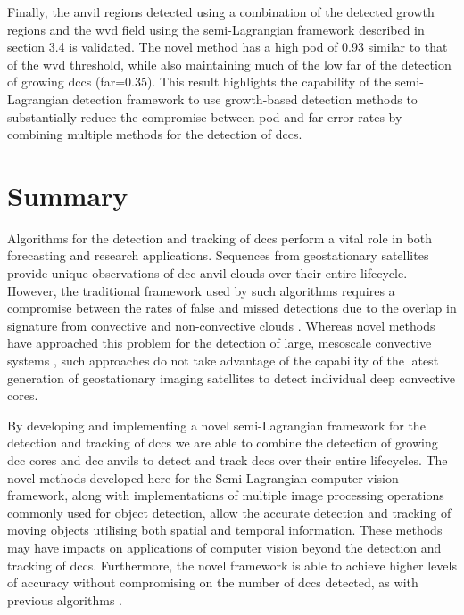 Finally, the anvil regions detected using a combination of the detected growth regions and the \acrshort{wvd} field using the semi-Lagrangian framework described in section 3.4 is validated.
The novel method has a high \acrshort{pod} of 0.93 similar to that of the \acrshort{wvd} threshold, while also maintaining much of the low \acrshort{far} of the detection of growing \acrshort{dcc}s (\acrshort{far}=0.35).
This result highlights the capability of the semi-Lagrangian detection framework to use growth-based detection methods to substantially reduce the compromise between \acrshort{pod} and \acrshort{far} error rates by combining multiple methods for the detection of \acrshort{dcc}s.


\section{Summary}  %

Algorithms for the detection and tracking of \acrshort{dcc}s perform a vital role in both forecasting and research applications.
Sequences from geostationary satellites provide unique observations of \acrshort{dcc} anvil clouds over their entire lifecycle.
However, the traditional framework used by such algorithms requires a compromise between the rates of false and missed detections due to the overlap in signature from convective and non-convective clouds \citep{konduru_new_2013}.
Whereas novel methods have approached this problem for the detection of large, mesoscale convective systems \citep{fiolleau_algorithm_2013}, such approaches do not take advantage of the capability of the latest generation of geostationary imaging satellites to detect individual deep convective cores.

By developing and implementing a novel semi-Lagrangian framework for the detection and tracking of \acrshort{dcc}s we are able to combine the detection of growing \acrshort{dcc} cores \citep{zinner_cb-tram:_2008} and \acrshort{dcc} anvils \citep{muller_role_2018} to detect and track \acrshort{dcc}s over their entire lifecycles.
The novel methods developed here for the Semi-Lagrangian computer vision framework, along with implementations of multiple image processing operations commonly used for object detection, allow the accurate detection and tracking of moving objects utilising both spatial and temporal information.
These methods may have impacts on applications of computer vision beyond the detection and tracking of \acrshort{dcc}s.
Furthermore, the novel framework is able to achieve higher levels of accuracy without compromising on the number of \acrshort{dcc}s detected, as with previous algorithms \citep{muller_novel_2019}.

